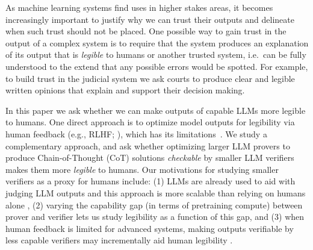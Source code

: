 \documentclass{article}
\begin{document}
As machine learning systems find uses in higher stakes areas, it becomes increasingly important to justify why we can trust their outputs and delineate when such trust should not be placed. One possible way to gain trust in the output of a complex system is to require that the system produces an explanation of its output that is \emph{legible} to humans or another trusted system, i.e.~can be fully understood to the extend that any possible errors would be spotted. For example, to build trust in the judicial system we ask courts to produce clear and legible written opinions that explain and support their decision making. 


In this paper we ask whether we can make outputs of capable LLMs more legible to humans. One direct approach is to optimize model outputs for legibility via human feedback (e.g., RLHF; \citeauthor{christiano2017deep} \citeyear{christiano2017deep}), which has its limitations~\citep{casper2023open}. We study a complementary approach, and ask whether optimizing larger LLM provers to produce Chain-of-Thought (CoT) solutions {\em checkable} by smaller LLM verifiers makes them more {\em legible} to humans. Our motivations for studying smaller verifiers as a proxy for humans include: (1) LLMs are already used to aid with judging LLM outputs and this approach is more scalable than relying on humans alone \citep{bai2022constitutional,saunders2022self,markov2023holistic}, (2) varying the capability gap (in terms of pretraining compute) between prover and verifier lets us study legibility as a function of this gap, and (3) when human feedback is limited for advanced systems, making outputs verifiable by less capable verifiers may incrementally aid human legibility \citep{leike2018scalable,christiano2018supervising}.
\end{document}
